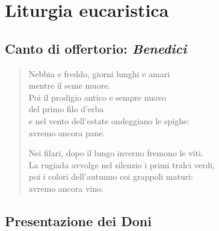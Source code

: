 
\section*{Liturgia eucaristica}

\subsection*{Canto di offertorio: \textit{Benedici}}

	\begin{verse}
		\begin{mystrofe}
		Nebbia e freddo, giorni lunghi e amari \\
		mentre il seme muore. \\
		Poi il prodigio antico e sempre nuovo \\
		del primo filo d'erba \\
		e nel vento dell'estate ondeggiano le spighe: \\
		avremo ancora pane.
		\end{mystrofe}


		\begin{mystrofe}
		Nei filari, dopo il lungo inverno fremono le viti. \\
		La rugiada avvolge nel silenzio i primi tralci verdi, \\
		poi i colori dell'autunno coi grappoli maturi: \\
		avremo ancora vino.
		\end{mystrofe}

	\end{verse}

\subsection*{Presentazione dei Doni}

